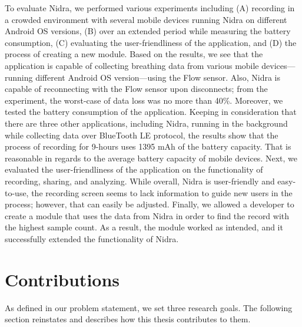 To evaluate Nidra, we performed various experiments including (A) recording in a crowded environment with several mobile devices running Nidra on different Android OS versions, (B) over an extended period while measuring the battery consumption, (C) evaluating the user-friendliness of the application, and (D) the process of creating a new module. Based on the results, we see that the application is capable of collecting breathing data from various mobile devices---running different Android OS version---using the Flow sensor. Also, Nidra is capable of reconnecting with the Flow sensor upon disconnects; from the experiment, the worst-case of data loss was no more than 40\%. Moreover, we tested the battery consumption of the application. Keeping in consideration that there are three other applications, including Nidra, running in the background while collecting data over BlueTooth LE protocol, the results show that the process of recording for 9-hours uses 1395 mAh of the battery capacity. That is reasonable in regards to the average battery capacity of mobile devices. Next, we evaluated the user-friendliness of the application on the functionality of recording, sharing, and analyzing. While overall, Nidra is user-friendly and easy-to-use, the recording screen seems to lack information to guide new users in the process; however, that can easily be adjusted. Finally, we allowed a developer to create a module that uses the data from Nidra in order to find the record with the highest sample count. As a result, the module worked as intended, and it successfully extended the functionality of Nidra. 


\section{Contributions}
 As defined in our problem statement, we set three research goals. The following section reinstates and describes how this thesis contributes to them.

